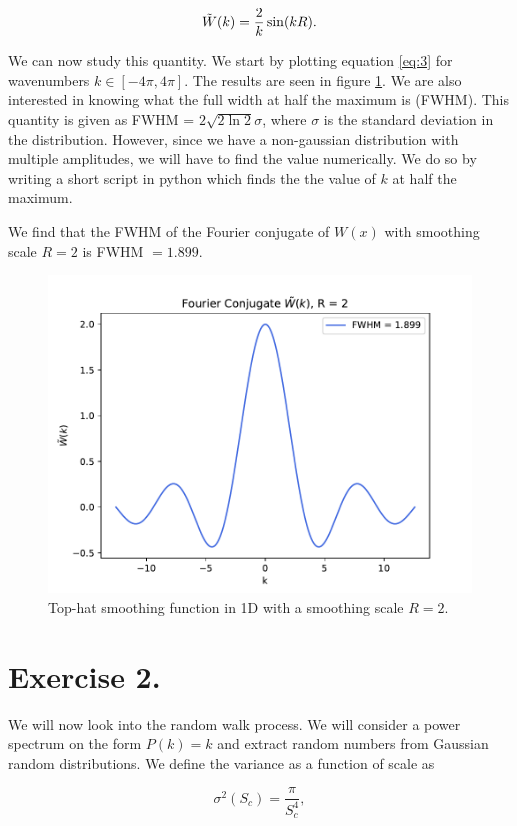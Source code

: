 \documentclass[a4paper,10pt]{article}
\begin{document}
\begin{equation}\label{eq:3}
    \Tilde{W}(k) = \frac{2}{k} \sin(kR).
\end{equation}

\noindent We can now study this quantity. We start by plotting equation \eqref{eq:3} for wavenumbers $k \in [-4\pi , 4\pi]$. The results are seen in figure \ref{fig:1}. We are also interested in knowing what the full width at half the maximum is (FWHM). This quantity is given as FWHM = $2 \sqrt{2\ln 2} \sigma$, where $\sigma$ is the standard deviation in the distribution. However, since we have a non-gaussian distribution with multiple amplitudes, we will have to find the value numerically. We do so by writing a short script in python which finds the the value of $k$ at half the maximum.

We find that the FWHM of the Fourier conjugate of $W(x)$ with smoothing scale $R = 2$ is FWHM $= 1.899$.


\begin{figure}[h]
    \centering
    \includegraphics[width=0.8\linewidth]{Figures/Window.pdf}
    \caption{Top-hat smoothing function in 1D with a smoothing scale $R = 2$.}
    \label{fig:1}
\end{figure}

\section*{Exercise 2.}

We will now look into the random walk process. We will consider a power spectrum on the form $P(k) = k$ and extract random numbers from Gaussian random distributions. We define the variance as a function of scale as

\begin{equation}\label{eq:4}
\sigma^2 (S_c) = \frac{\pi}{S_c^4},
\end{equation}
\end{document}
